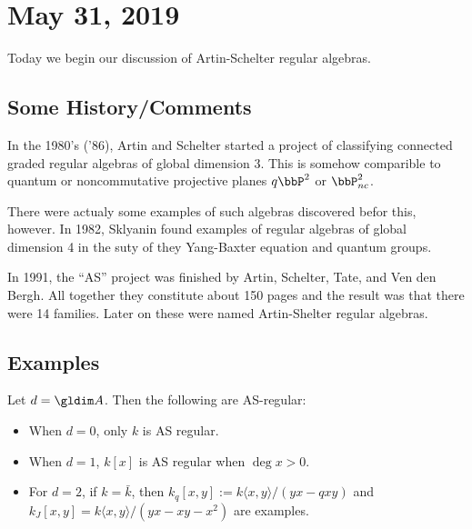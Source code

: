 \documentclass[12pt]{article}
\begin{document}
\section{May 31, 2019}
Today we begin our discussion of Artin-Schelter regular algebras.
\subsection{Some History/Comments}
In the 1980's ('86), Artin and Schelter started a project of classifying connected graded regular algebras of global dimension 3. 
This is somehow comparible to quantum or noncommutative projective planes $q\bbP^2$ or $\bbP^2_{nc}$.

There were actualy some examples of such algebras discovered befor this, however. In 1982, 
Sklyanin found examples of regular algebras of global dimension 4 in the suty of they Yang-Baxter equation and quantum groups.

In 1991, the ``AS'' project was finished by Artin, Schelter, Tate, and Ven den Bergh. All together they constitute about 
150 pages and the result was that there were 14 families. Later on these were named Artin-Shelter regular algebras.

\subsection{Examples}
\begin{ex}
	Let $d=\gldim A$. Then the following are AS-regular:
	\begin{itemize}
		\item When $d=0$, only $k$ is AS regular.
		\item When $d=1$, $k[x]$ is AS regular when $\deg x>0$.
		\item For $d=2$, if $k=\bar k$, then $k_q[x,y]:=k\langle x,y\rangle/(yx-qxy)$ and $k_J[x,y]=k\langle x,y\rangle/(yx-xy-x^2)$ are examples.
	\end{itemize}
\end{ex}
\end{document}
